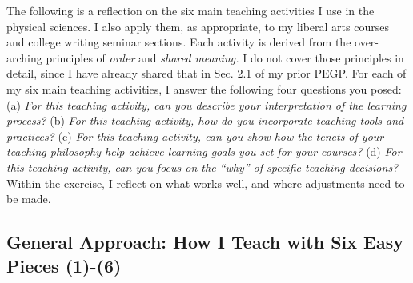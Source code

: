 \documentclass[../../../main.tex]{subfiles}
\begin{document}
The following is a reflection on the six main teaching activities I use in the physical sciences.  I also apply them, as appropriate, to my liberal arts courses and college writing seminar sections.  Each activity is derived from the over-arching principles of \textit{order} and \textit{shared meaning.}  I do not cover those principles in detail, since I have already shared that in Sec. 2.1 of my prior PEGP.  For each of my six main teaching activities, I answer the following four questions you posed: (a) \textit{For this teaching activity, can you describe your interpretation of the learning process?} (b) \textit{For this teaching activity, how do you incorporate teaching tools and practices?} (c) \textit{For this teaching activity, can you show how the tenets of your teaching philosophy help achieve learning goals you set for your courses?} (d) \textit{For this teaching activity, can you focus on the ``why'' of specific teaching decisions?}  Within the exercise, I reflect on what works well, and where adjustments need to be made.

\subsection{General Approach: How I Teach with Six Easy Pieces (1)-(6)}
\end{document}
